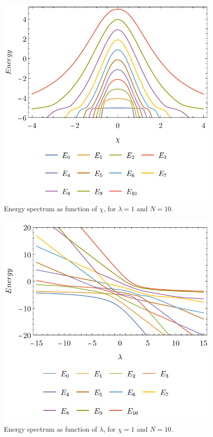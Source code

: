 \begin{figure}[h]
    \centering
    \includegraphics{../img/N=10_energiesl.pdf}
    \caption{Energy spectrum as function of $\chi$, for $\lambda=1$ and $N=10$.}
    \label{fig:N=10_energiesl}    
\end{figure}
\begin{figure}[h]
    \centering
    \includegraphics{../img/N=10_energies2.pdf}
    \caption{Energy spectrum as function of $\lambda$, for $\chi=1$ and $N=10$.}
    \label{fig:N=10_energies2}    
\end{figure}


